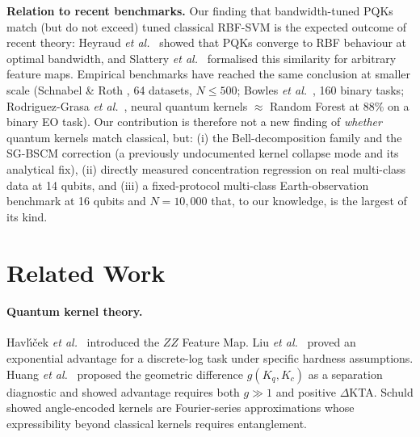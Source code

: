 \documentclass[pdflatex,sn-mathphys-num]{sn-jnl}
\theoremstyle{thmstyleone}
\theoremstyle{thmstyletwo}
\theoremstyle{thmstylethree}
\begin{document}
\medskip
\noindent\textbf{Relation to recent benchmarks.}
Our finding that bandwidth-tuned PQKs match (but do not exceed) tuned
classical RBF-SVM is the expected outcome of recent theory:
Heyraud \emph{et al.}\ \cite{heyraud2022} showed that PQKs converge to
RBF behaviour at optimal bandwidth, and Slattery \emph{et al.}\
\cite{slattery2025} formalised this similarity for arbitrary feature
maps. Empirical benchmarks have reached the same conclusion at smaller
scale (Schnabel \& Roth \cite{schnabel2025}, 64 datasets,
$N\!\le\!500$; Bowles \emph{et al.}\ \cite{bowles2024}, 160 binary tasks;
Rodriguez-Grasa \emph{et al.}\ \cite{rodriguez2025}, neural quantum
kernels $\approx$ Random Forest at $88\%$ on a binary EO task). Our
contribution is therefore not a new finding of \emph{whether} quantum
kernels match classical, but: (i) the Bell-decomposition family and the
SG-BSCM correction (a previously undocumented kernel collapse mode and
its analytical fix), (ii) directly measured concentration regression on
real multi-class data at 14 qubits, and (iii) a fixed-protocol
multi-class Earth-observation benchmark at 16 qubits and $N=10{,}000$
that, to our knowledge, is the largest of its kind.

\section{Related Work}\label{sec:related}

\paragraph{Quantum kernel theory.}
Havl{\'\i}{\v{c}}ek \emph{et al.}\ \cite{havlicek2019} introduced the $ZZ$
Feature Map. Liu \emph{et al.}\ \cite{liu2021} proved an exponential
advantage for a discrete-log task under specific hardness assumptions.
Huang \emph{et al.}\ \cite{huang2021} proposed the geometric difference
$g(K_q,K_c)$ as a separation diagnostic and showed advantage requires
both $g\!\gg\!1$ and positive $\Delta$KTA. Schuld \cite{schuld2021}
showed angle-encoded kernels are Fourier-series approximations whose
expressibility beyond classical kernels requires entanglement.
\end{document}
